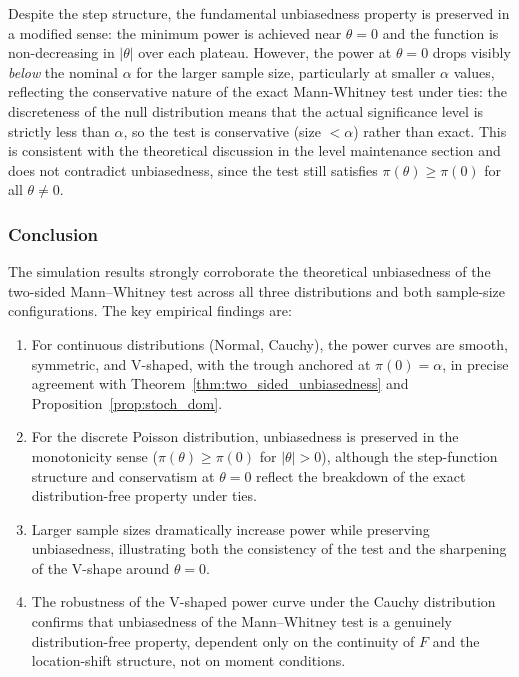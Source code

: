 \documentclass[10pt]{article}
\begin{document}
Despite the step structure, the fundamental unbiasedness property
is preserved in a modified sense: the minimum power is achieved
near $\theta = 0$ and the function is non-decreasing in $|\theta|$
over each plateau. However, the power at $\theta = 0$ drops visibly
\emph{below} the nominal $\alpha$ for the larger sample size,
particularly at smaller $\alpha$ values, reflecting the
conservative nature of the exact Mann-Whitney test under ties: the
discreteness of the null distribution means that the actual
significance level is strictly less than $\alpha$, so the test is
conservative (size $<\alpha$) rather than exact. This is consistent
with the theoretical discussion in the level maintenance section and
does not contradict unbiasedness, since the test still satisfies
$\pi(\theta) \geq \pi(0)$ for all $\theta \neq 0$.

\subsubsection{Conclusion}

The simulation results strongly corroborate the theoretical
unbiasedness of the two-sided Mann--Whitney test across all three
distributions and both sample-size configurations. The key empirical
findings are:

\begin{enumerate}
  \item For continuous distributions (Normal, Cauchy), the power
        curves are smooth, symmetric, and V-shaped, with the trough
        anchored at $\pi(0) = \alpha$, in precise agreement with
        Theorem~\ref{thm:two_sided_unbiasedness} and
        Proposition~\ref{prop:stoch_dom}.

  \item For the discrete Poisson distribution, unbiasedness is
        preserved in the monotonicity sense ($\pi(\theta) \geq
        \pi(0)$ for $|\theta| > 0$), although the step-function
        structure and conservatism at $\theta = 0$ reflect the
        breakdown of the exact distribution-free property under ties.

  \item Larger sample sizes dramatically increase power while
        preserving unbiasedness, illustrating both the consistency
        of the test and the sharpening of the V-shape around
        $\theta = 0$.

  \item The robustness of the V-shaped power curve under the Cauchy
        distribution confirms that unbiasedness of the Mann--Whitney
        test is a genuinely distribution-free property, dependent
        only on the continuity of $F$ and the location-shift
        structure, not on moment conditions.
\end{enumerate}
\end{document}

